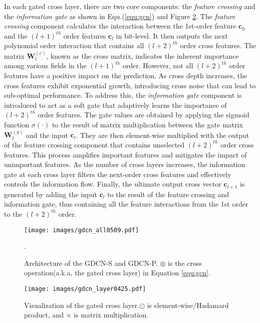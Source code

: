 \documentclass[sigconf]{acmart}
\begin{document}
In each gated cross layer, there are two core components: the \textit{feature crossing} and the \textit{information gate} as shown in Equ.(\ref{equ:gcn}) and Figure \ref{fig:gcn}. The \textit{feature crossing} component calculates the interaction between the 1st-order feature $\mathbf{c}_0$ and the $(l+1)^{th}$ order features $\mathbf{c}_{l}$ in bit-level. It then outputs the next polynomial order interaction that contains all $(l+2)^{th}$ order cross features. The matrix $\mathbf{W}_l^{(c)}$, known as the cross matrix, indicates the inherent importance among various fields in the $(l+1)^{th}$ order. However, not all $(l+2)^{th}$ order features have a positive impact on the prediction. As cross depth increases, the cross features exhibit exponential growth, introducing cross noise that can lead to sub-optimal performance. To address this, the \textit{information gate} component is introduced to act as a soft gate that adaptively learns the importance of $(l+2)^{th}$ order features. The gate values are obtained by applying the sigmoid function $\sigma(\cdot)$ to the result of matrix multiplication between the gate matrix $\mathbf{W}_l^{(g)}$ and the input $\mathbf{c}_{l}$. They are then element-wise multiplied with the output of the feature crossing component that contains unselected $(l+2)^{th}$ order cross features. This process amplifies important features and mitigates the impact of unimportant features. As the number of cross layers increases, the information gate at each cross layer filters the next-order cross features and effectively controls the information flow. Finally, the ultimate output cross vector $\mathbf{c}_{l+1}$ is generated by adding the input $\mathbf{c}_{l}$ to the result of the feature crossing and information gate, thus containing all the feature interactions from the 1st order to the $(l+2)^{th}$ order. 



\begin{figure}[t]
    \setlength{\abovecaptionskip}{0.2cm}
    \setlength{\belowcaptionskip}{-0.2cm}
    \centering
    \texttt{[image: images/gdcn\_all0509.pdf]}
    \caption{Architecture of the GDCN-S and GDCN-P. $\otimes$ is the cross operation(a.k.a, the gated cross layer) in Equation \ref{equ:gcn}.}.
\label{fig:gdcn}
\end{figure}

\begin{figure}[t]
    \setlength{\abovecaptionskip}{0.2cm}
    \setlength{\belowcaptionskip}{-0.2cm}
    \centering
    \texttt{[image: images/gdcn\_layer0425.pdf]}
    \caption{Visualization of the gated cross layer.$\odot$ is element-wise/Hadamard product, and $\times$ is matrix multiplication.}
    \label{fig:gcn}
\end{figure}
\end{document}
